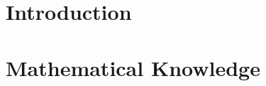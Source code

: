 \documentclass[12pt,a4paper,twoside]{book}
\begin{document}
\setlength{\parindent}{2em}

\iffalse
\begingroup
  \pagenumbering{roman}
  

\newpage

\thispagestyle{empty}

\rule{0cm}{5cm}

\newpage

\thispagestyle{empty}






\newpage

\endgroup


\pagestyle{fancy}

\renewcommand{\sectionmark}[1]{\markright{\thesection\ #1}}
\renewcommand{\chaptermark}[1]{\markboth{\thechapter\ #1}{}}
\lhead[\rm\thepage]{\sl\rightmark}
\chead{}
\rhead[\sl\leftmark]{\rm\thepage}

\lfoot{}
\cfoot{}
\rfoot{}


\tableofcontents


\fi



%

%

%

%

%

%

% 

%
\section{Introduction}

\section{Mathematical Knowledge}
\end{document}
